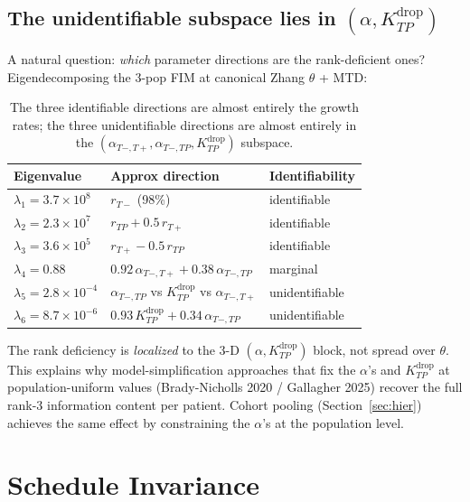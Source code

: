 \documentclass[11pt]{article}
\newcommand{\Kdrop}{K_{TP}^{\text{drop}}}
\newcommand{\Tplus}{T{+}}
\newcommand{\Tminus}{T{-}}
\begin{document}
\subsection{The unidentifiable subspace lies in $(\alpha, \Kdrop)$}\label{sec:unident_subspace}

A natural question: \emph{which} parameter directions are the rank-deficient
ones? Eigendecomposing the 3-pop FIM at canonical Zhang $\theta$ + MTD:

\begin{table}[h]
\centering
\begin{tabular}{lll}
\toprule
Eigenvalue & Approx direction & Identifiability \\
\midrule
$\lambda_1 = 3.7 \times 10^8$ & $r_{\Tminus}$ (98\%) & identifiable \\
$\lambda_2 = 2.3 \times 10^7$ & $r_{TP} + 0.5\, r_{\Tplus}$ & identifiable \\
$\lambda_3 = 3.6 \times 10^5$ & $r_{\Tplus} - 0.5\, r_{TP}$ & identifiable \\
$\lambda_4 = 0.88$ & $0.92\,\alpha_{\Tminus,\Tplus} + 0.38\,\alpha_{\Tminus,TP}$ & marginal \\
$\lambda_5 = 2.8 \times 10^{-4}$ & $\alpha_{\Tminus,TP}$ vs $\Kdrop$ vs $\alpha_{\Tminus,\Tplus}$ & unidentifiable \\
$\lambda_6 = 8.7 \times 10^{-6}$ & $0.93\,\Kdrop + 0.34\,\alpha_{\Tminus,TP}$ & unidentifiable \\
\bottomrule
\end{tabular}
\caption{The three identifiable directions are almost entirely the growth
rates; the three unidentifiable directions are almost entirely in the
$(\alpha_{\Tminus,\Tplus}, \alpha_{\Tminus,TP}, \Kdrop)$ subspace.}
\end{table}

The rank deficiency is \emph{localized} to the 3-D $(\alpha, \Kdrop)$ block,
not spread over $\theta$. This explains why model-simplification approaches
that fix the $\alpha$'s and $\Kdrop$ at population-uniform values
(Brady-Nicholls 2020 / Gallagher 2025) recover the full rank-3 information
content per patient. Cohort pooling (Section~\ref{sec:hier}) achieves the
same effect by constraining the $\alpha$'s at the population level.

\section{Schedule Invariance}\label{sec:schedule}
\end{document}
